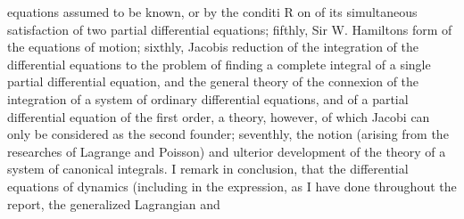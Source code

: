 \documentclass[12pt,a4paper]{article}
\theoremstyle{definition}
\begin{document}
equations assumed to be known, or by the conditi R on of its simultaneous satisfaction of
two partial differential equations; fifthly, Sir W. Hamiltons form of the equations
of motion; sixthly, Jacobis reduction of the integration of the differential equations
to the problem of finding a complete integral of a single partial differential equation,
and the general theory of the connexion of the integration of a system of ordinary
differential equations, and of a partial differential equation of the first order, a theory,
however, of which Jacobi can only be considered as the second founder; seventhly, the
notion (arising from the researches of Lagrange and Poisson) and ulterior development
of the theory of a system of canonical integrals.
I remark in conclusion, that the differential equations of dynamics (including in
the expression, as I have done throughout the report, the generalized Lagrangian and
\end{document}
